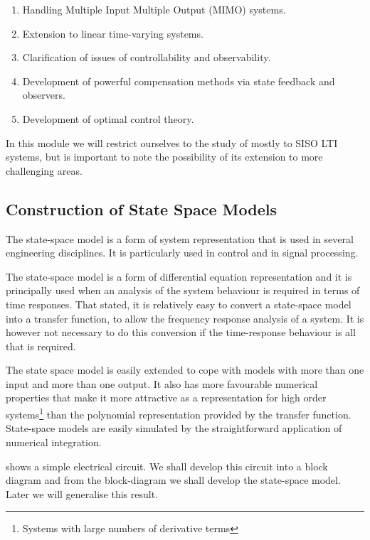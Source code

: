  
\begin{slide}\label{slides:l13s2}
\begin{enumerate}
\item Handling Multiple Input Multiple Output (MIMO) systems.
\item Extension to linear time-varying systems.
\item Clarification of issues of controllability and observability.
\item Development of powerful compensation methods via state feedback and observers.
\item Development of optimal control theory.
\end{enumerate}
\end{slide}
In this module we will restrict ourselves to the study of mostly to SISO LTI systems, but is important to note the possibility of its extension to more challenging areas.

 
\subsection*{Construction of State Space Models}

The state-space model is a form of system representation that is used
in several engineering disciplines. It is particularly used in control
and in signal processing.

The state-space model is a form of differential equation
representation and it is principally used when an analysis of the
system behaviour is required in terms of time responses. That
stated, it is relatively easy to convert a state-space model into
a transfer function, to allow the frequency response analysis of a
system. It is however not necessary to do this conversion if the
time-response behaviour is all that is required.

The state space model is easily extended to cope with models with more
than one input and more than one output. It also has more favourable
numerical properties that make it more attractive as a representation
for high order systems\footnote{Systems with large numbers of
  derivative terms} than the polynomial representation provided by the
transfer function. State-space models are easily simulated by the
straightforward application of numerical integration.

 shows a simple electrical circuit. We shall develop
this circuit into a block diagram and from the block-diagram we shall
develop the state-space model. Later we will generalise this result.

